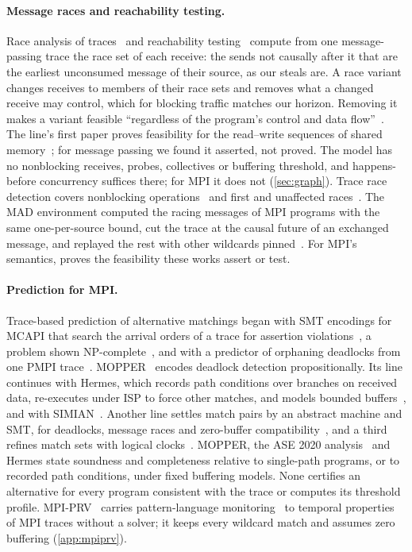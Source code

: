 \paragraph{Message races and reachability testing.} Race analysis of
traces~\citep{tai97race} and reachability testing~\citep{lei06reachability} compute from one
message-passing trace the race set of each receive: the sends not causally after
it that are the earliest unconsumed message of their source, as our steals are. A race variant
changes receives to members of their race sets and removes what a changed receive may
control, which for blocking traffic matches our horizon. Removing it makes
a variant feasible ``regardless of the program's control and data
flow''~\citep[p.\,390]{lei06reachability}.
The line's first paper proves feasibility for the read--write sequences of shared
memory~\citep{hwang94apsec}; for message passing we found it asserted, not proved. The model has no
nonblocking receives, probes, collectives or buffering threshold, and happens-before
concurrency suffices there; for MPI it does not (\cref{sec:graph}). Trace race detection covers
nonblocking operations~\citep{cypher95race} and first and unaffected
races~\citep{netzer96msgrace,park04unaffected,park07mpirace}. The MAD
environment computed the racing messages of MPI programs with the same one-per-source bound,
cut the trace at the causal future of an exchanged message, and replayed the rest with
other wildcards pinned~\citep{kranzlmueller00thesis,kranzlmueller00mad}. For MPI's semantics,
\tool proves the feasibility these works assert or test.

\paragraph{Prediction for MPI\@.} Trace-based prediction of alternative matchings began with SMT
encodings for MCAPI that search the arrival orders of a trace for assertion
violations~\citep{elwakil10padtad,huang13ase}, a problem shown NP-complete~\citep{huang13ase},
and with a predictor of orphaning deadlocks from one PMPI trace~\citep{sharma12maaped}.
MOPPER~\citep{forejt14mopper,forejt17mopper} encodes deadlock detection propositionally. Its
line continues with Hermes, which records path conditions over branches on received data,
re-executes under ISP to force other matches, and models bounded
buffers~\citep{khanna18hermes}, and with SIMIAN~\citep{ranjan22simian}. Another line settles
match pairs by an abstract machine and SMT, for deadlocks, message races and zero-buffer
compatibility~\citep{huang20matchpair,huang20ase,huang23tpds}, and a third refines match sets
with logical clocks~\citep{cluster22matchsets,li24parco,internetware24}. MOPPER, the ASE 2020
analysis~\citep{huang20ase} and Hermes state soundness and completeness relative to
single-path programs, or to recorded path conditions, under fixed buffering models. None
certifies an alternative for every program consistent with the trace or computes its
threshold profile. MPI-PRV~\citep{yao26mpiprv} carries pattern-language
monitoring~\citep{ang24pattern} to temporal properties of MPI traces without a solver; it
keeps every wildcard match and assumes zero buffering (\cref{app:mpiprv}).

